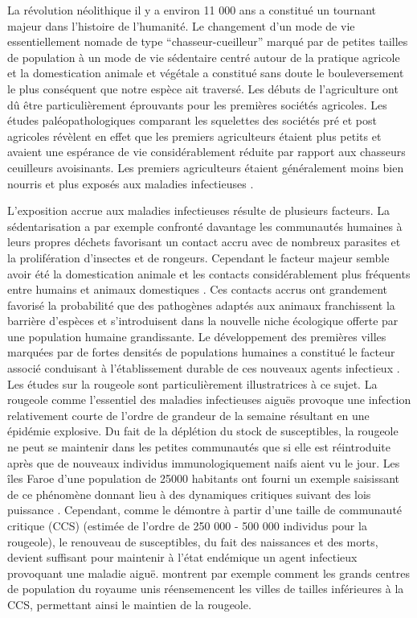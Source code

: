 La révolution néolithique il y a environ 11 000 ans a constitué un
tournant majeur dans l'histoire de l'humanité. Le changement d'un mode
de vie essentiellement nomade de type ``chasseur-cueilleur'' marqué
par de petites tailles de population à un mode de vie sédentaire
centré autour de la pratique agricole et la domestication animale et
végétale a constitué sans doute le bouleversement le plus conséquent
que notre espèce ait traversé. Les débuts de l'agriculture ont dû être
particulièrement éprouvants pour les premières sociétés agricoles. Les
études paléopathologiques comparant les squelettes des sociétés pré et
post agricoles révèlent en effet que les premiers agriculteurs étaient
plus petits et avaient une espérance de vie considérablement réduite
par rapport aux chasseurs ceuilleurs avoisinants. Les premiers
agriculteurs étaient généralement moins bien nourris et plus exposés
aux maladies infectieuses \citep{McMichael2004}.

L'exposition accrue aux maladies infectieuses résulte de plusieurs
facteurs. La sédentarisation a par exemple confronté davantage les
communautés humaines à leurs propres déchets favorisant un contact
accru avec de nombreux parasites et la prolifération d'insectes et de
rongeurs. Cependant le facteur majeur semble avoir été la
domestication animale et les contacts considérablement plus fréquents
entre humains et animaux domestiques \citep{Diamond2002}. Ces contacts
accrus ont grandement favorisé la probabilité que des pathogènes
adaptés aux animaux franchissent la barrière d'espèces
\citep{Antia2003} et s'introduisent dans la nouvelle niche écologique
offerte par une population humaine grandissante. Le développement des
premières villes marquées par de fortes densités de populations
humaines a constitué le facteur associé conduisant à l'établissement
durable de ces nouveaux agents infectieux \citep{Armelagos2005}. Les
études sur la rougeole sont particulièrement illustratrices à ce
sujet. La rougeole comme l'essentiel des maladies infectieuses aiguës
provoque une infection relativement courte de l'ordre de grandeur de
la semaine résultant en une épidémie explosive. Du fait de la
déplétion du stock de susceptibles, la rougeole ne peut se maintenir
dans les petites communautés que si elle est réintroduite après que de
nouveaux individus immunologiquement naifs aient vu le jour. Les îles
Faroe d'une population de 25000 habitants ont fourni un exemple
saisissant de ce phénomène donnant lieu à des dynamiques critiques
suivant des lois puissance \citep{Rhodes1996, Rhodes1997}. Cependant,
comme le démontre \citet{Bartlett1957, Bartlett1960} à partir d'une
taille de communauté critique (CCS) (estimée de l'ordre de 250 000 -
500 000 individus pour la rougeole), le renouveau de susceptibles, du
fait des naissances et des morts, devient suffisant pour maintenir à
l'état endémique un agent infectieux provoquant une maladie aiguë.
\citet{Grenfell2001} montrent par exemple comment les grands centres
de population du royaume unis réensemencent les villes de tailles
inférieures à la CCS, permettant ainsi le maintien de la rougeole.

